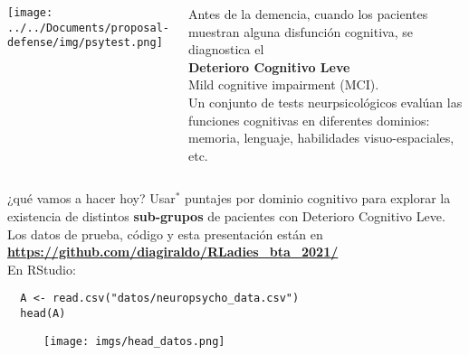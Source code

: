 \documentclass[10pt, aspectratio=169]{beamer}
\newcommand{\hltext}[2]{\colorbox{#1}{\textcolor{white}{\textbf{#2}}}}
\begin{document}
\begin{frame}[fragile]{}
\begin{overlayarea}{\textwidth}{9cm}
\vspace{0.5cm}
\begin{columns}
  \vspace{0.1cm}
  \texttt{[image: ../../Documents/proposal-defense/img/psytest.png]}
 \begin{center}
  Antes de la demencia, cuando los pacientes muestran alguna disfunción cognitiva, se diagnostica el\\ 
 \vspace{0.3cm}
 \textcolor{BlueMoon}{\textbf{\Large Deterioro Cognitivo Leve}}\\
 Mild cognitive impairment (MCI).\\
 \vspace{0.3cm}
 Un conjunto de tests neurpsicológicos evalúan las funciones cognitivas en diferentes dominios: memoria, lenguaje, habilidades visuo-espaciales, etc.
 \end{center}
\end{columns}
\end{overlayarea}
\end{frame}

{%
\begin{frame}[fragile]{¿qué vamos a hacer hoy?}
 Usar$^*$ puntajes por dominio cognitivo para explorar la existencia de distintos \textbf{sub-grupos} de pacientes con Deterioro Cognitivo Leve.\\
 \vspace{0.2cm}
 \pause
 Los datos de prueba, código y esta presentación están en\\ \hltext{PinkPeacock}{\url{https://github.com/diagiraldo/RLadies_bta_2021/}}\\
 \vspace{0.4cm}
 \pause
 En RStudio:\\
 \vspace{-0.2cm}
 \begin{verbatim}
  A <- read.csv("datos/neuropsycho_data.csv")
  head(A)
 \end{verbatim}
 \vspace{-0.6cm}
 \begin{figure}
  \texttt{[image: imgs/head\_datos.png]}
 \end{figure}
\end{frame}
}
\end{document}
